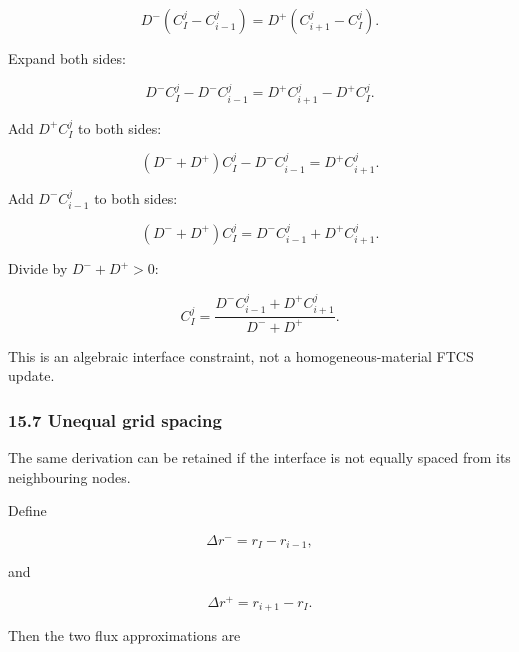 \documentclass[11pt,a4paper]{article}
\begin{document}
\begin{equation}
D^-
\left(
C_I^j-C_{i-1}^j
\right)
=
D^+
\left(
C_{i+1}^j-C_I^j
\right).
\tag{TRISO-DIS-319}
\label{eq:triso-dis-319}
\end{equation}

Expand both sides:

\begin{equation}
D^-C_I^j-D^-C_{i-1}^j
=
D^+C_{i+1}^j-D^+C_I^j.
\tag{TRISO-DIS-320}
\label{eq:triso-dis-320}
\end{equation}

Add $D^+C_I^j$ to both sides:

\begin{equation}
(D^-+D^+)C_I^j-D^-C_{i-1}^j
=
D^+C_{i+1}^j.
\tag{TRISO-DIS-321}
\label{eq:triso-dis-321}
\end{equation}

Add $D^-C_{i-1}^j$ to both sides:

\begin{equation}
(D^-+D^+)C_I^j
=
D^-C_{i-1}^j
+
D^+C_{i+1}^j.
\tag{TRISO-DIS-322}
\label{eq:triso-dis-322}
\end{equation}

Divide by $D^-+D^+>0$:

\begin{equation}
\boxed{
C_I^j
=
\frac{
D^-C_{i-1}^j
+
D^+C_{i+1}^j
}{
D^-+D^+
}.
}
\tag{TRISO-DIS-323}
\label{eq:triso-dis-323}
\end{equation}

This is an algebraic interface constraint, not a homogeneous-material FTCS update.

\subsubsection*{15.7 Unequal grid spacing}

The same derivation can be retained if the interface is not equally spaced from its neighbouring nodes.

Define

\begin{equation}
\Delta r^-=r_I-r_{i-1},
\tag{TRISO-DIS-324}
\label{eq:triso-dis-324}
\end{equation}

and

\begin{equation}
\Delta r^+=r_{i+1}-r_I.
\tag{TRISO-DIS-325}
\label{eq:triso-dis-325}
\end{equation}

Then the two flux approximations are
\end{document}
